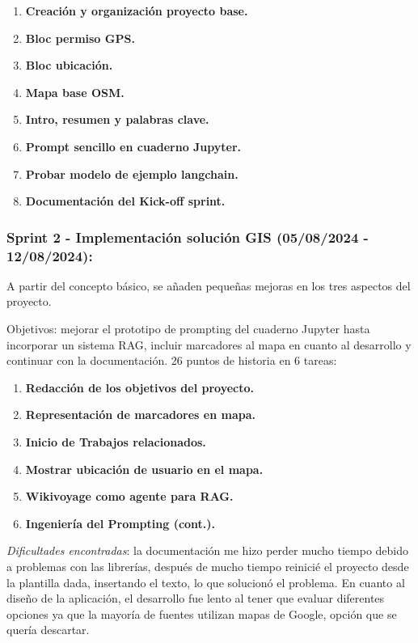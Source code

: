     \begin{enumerate}
    	\item \textbf{Creación y organización proyecto base.}
    	\item \textbf{Bloc permiso GPS.}
    	\item \textbf{Bloc ubicación.}
    	\item \textbf{Mapa base OSM.}
    	\item \textbf{Intro, resumen y palabras clave.}
    	\item \textbf{Prompt sencillo en cuaderno Jupyter.}
    	\item \textbf{Probar modelo de ejemplo \gls{langchain}.}
    	\item \textbf{Documentación del Kick-off sprint.}
    \end{enumerate}
        
    
\subsubsection{Sprint 2 - Implementación solución GIS (05/08/2024 - 12/08/2024):} 
A partir del concepto básico, se añaden pequeñas mejoras en los tres aspectos del proyecto.
    
    Objetivos: mejorar el prototipo de prompting del cuaderno Jupyter hasta incorporar un sistema RAG, incluir marcadores al mapa en cuanto al desarrollo y continuar con la documentación. 26 puntos de historia en 6 tareas:

	\begin{enumerate}
		\item \textbf{Redacción de los objetivos del proyecto.}
		\item \textbf{Representación de marcadores en mapa.}
		\item \textbf{Inicio de Trabajos relacionados.}
		\item \textbf{Mostrar ubicación de usuario en el mapa.}
		\item \textbf{Wikivoyage como agente para RAG.}
		\item \textbf{Ingeniería del Prompting (cont.).}
	\end{enumerate}
        
    
    \textit{Dificultades encontradas}: la documentación me hizo perder mucho tiempo debido a problemas con las librerías, después de mucho tiempo reinicié el proyecto desde la plantilla dada, insertando el texto, lo que solucionó el problema. En cuanto al diseño de la aplicación, el desarrollo fue lento al tener que evaluar diferentes opciones ya que la mayoría de fuentes utilizan mapas de Google, opción que se quería descartar.
 

